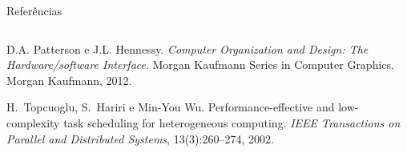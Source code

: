 \documentclass[final]{beamer}
\begin{document}
\begin{frame}[t]
\begin{block}{Referências}
\begin{columns}[t]
\begin{column}{0.30\columnwidth}
{\begin{thebibliography}{99}
			D.A. Patterson e J.L. Hennessy. {\em Computer Organization and Design: The Hardware/software
			  Interface}. Morgan Kaufmann Series in Computer Graphics. Morgan Kaufmann, 2012.

			H.~Topcuoglu, S.~Hariri e Min-You Wu.
			Performance-effective and low-complexity task scheduling for
			  heterogeneous computing.
			{\em IEEE Transactions on Parallel and Distributed Systems},
			  13(3):260--274, 2002.

			\end{thebibliography}}
	
	\end{column}
\end{columns}
\end{block}

\end{frame}
\end{document}
